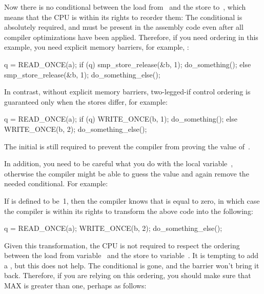 Now there is no conditional between the load from~ and the store
to~, which means that the CPU is within its rights to reorder them:
The conditional is absolutely required, and must be present in the
assembly code even after all compiler optimizations have been applied.
Therefore, if you need ordering in this example, you need explicit
memory barriers, for example, :

\begin{VerbatimU}
	q = READ_ONCE(a);
	if (q) {
		smp_store_release(&b, 1);
		do_something();
	} else {
		smp_store_release(&b, 1);
		do_something_else();
	}
\end{VerbatimU}

In contrast, without explicit memory barriers, two-legged-if control
ordering is guaranteed only when the stores differ, for example:

\begin{VerbatimU}
	q = READ_ONCE(a);
	if (q) {
		WRITE_ONCE(b, 1);
		do_something();
	} else {
		WRITE_ONCE(b, 2);
		do_something_else();
	}
\end{VerbatimU}

The initial  is still required to prevent the compiler from
proving the value of~.

In addition, you need to be careful what you do with the local variable~,
otherwise the compiler might be able to guess the value and again remove
the needed conditional.  For example:


If  is defined to be~1, then the compiler knows that  is
equal to zero, in which case the compiler is within its rights to
transform the above code into the following:

\begin{VerbatimU}
	q = READ_ONCE(a);
	WRITE_ONCE(b, 2);
	do_something_else();
\end{VerbatimU}

Given this transformation, the CPU is not required to respect the ordering
between the load from variable~ and the store to variable~.
It is tempting to add a , but this does not help.
The conditional is gone, and the barrier won't bring it back.
Therefore, if you are relying on this ordering, you should make sure that
MAX is greater than one, perhaps as follows:

